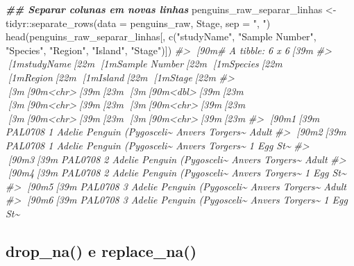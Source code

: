 \documentclass[
]{book}
\newenvironment{Shaded}{\begin{snugshade}}{\end{snugshade}}
\newcommand{\AttributeTok}[1]{\textcolor[rgb]{0.61,0.61,0.61}{#1}}
\newcommand{\CommentTok}[1]{\textcolor[rgb]{0.37,0.37,0.37}{\textit{#1}}}
\newcommand{\DocumentationTok}[1]{\textcolor[rgb]{0.37,0.37,0.37}{\textbf{\textit{#1}}}}
\newcommand{\FunctionTok}[1]{\textcolor[rgb]{0,0,0}{#1}}
\newcommand{\NormalTok}[1]{#1}
\newcommand{\OtherTok}[1]{\textcolor[rgb]{0.37,0.37,0.37}{#1}}
\newcommand{\SpecialCharTok}[1]{\textcolor[rgb]{0,0,0}{#1}}
\newcommand{\StringTok}[1]{\textcolor[rgb]{0.5,0.5,0.5}{#1}}
\begin{document}
\begin{Shaded}
\begin{Highlighting}[]
\DocumentationTok{\#\# Separar colunas em novas linhas}
\NormalTok{penguins\_raw\_separar\_linhas }\OtherTok{\textless{}{-}}\NormalTok{ tidyr}\SpecialCharTok{::}\FunctionTok{separate\_rows}\NormalTok{(}\AttributeTok{data =}\NormalTok{ penguins\_raw,}
\NormalTok{                                                    Stage,}
                                                    \AttributeTok{sep =} \StringTok{", "}\NormalTok{)}
\FunctionTok{head}\NormalTok{(penguins\_raw\_separar\_linhas[, }\FunctionTok{c}\NormalTok{(}\StringTok{"studyName"}\NormalTok{, }\StringTok{"Sample Number"}\NormalTok{, }\StringTok{"Species"}\NormalTok{, }
                                     \StringTok{"Region"}\NormalTok{, }\StringTok{"Island"}\NormalTok{, }\StringTok{"Stage"}\NormalTok{)])}
\CommentTok{\#\textgreater{} [90m\# A tibble: 6 x 6[39m}
\CommentTok{\#\textgreater{}   [1mstudyName[22m [1m\textasciigrave{}Sample Number\textasciigrave{}[22m [1mSpecies[22m                    [1mRegion[22m [1mIsland[22m   [1mStage[22m    }
\CommentTok{\#\textgreater{}   [3m[90m\textless{}chr\textgreater{}[39m[23m               [3m[90m\textless{}dbl\textgreater{}[39m[23m [3m[90m\textless{}chr\textgreater{}[39m[23m                      [3m[90m\textless{}chr\textgreater{}[39m[23m  [3m[90m\textless{}chr\textgreater{}[39m[23m    [3m[90m\textless{}chr\textgreater{}[39m[23m    }
\CommentTok{\#\textgreater{} [90m1[39m PAL0708                 1 Adelie Penguin (Pygosceli\textasciitilde{} Anvers Torgers\textasciitilde{} Adult    }
\CommentTok{\#\textgreater{} [90m2[39m PAL0708                 1 Adelie Penguin (Pygosceli\textasciitilde{} Anvers Torgers\textasciitilde{} 1 Egg St\textasciitilde{}}
\CommentTok{\#\textgreater{} [90m3[39m PAL0708                 2 Adelie Penguin (Pygosceli\textasciitilde{} Anvers Torgers\textasciitilde{} Adult    }
\CommentTok{\#\textgreater{} [90m4[39m PAL0708                 2 Adelie Penguin (Pygosceli\textasciitilde{} Anvers Torgers\textasciitilde{} 1 Egg St\textasciitilde{}}
\CommentTok{\#\textgreater{} [90m5[39m PAL0708                 3 Adelie Penguin (Pygosceli\textasciitilde{} Anvers Torgers\textasciitilde{} Adult    }
\CommentTok{\#\textgreater{} [90m6[39m PAL0708                 3 Adelie Penguin (Pygosceli\textasciitilde{} Anvers Torgers\textasciitilde{} 1 Egg St\textasciitilde{}}
\end{Highlighting}
\end{Shaded}

\hypertarget{drop_na-e-replace_na}{%
\subsection{drop\_na() e replace\_na()}\label{drop_na-e-replace_na}}
\end{document}
